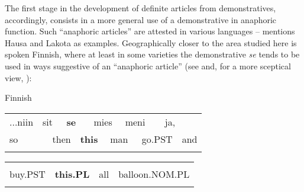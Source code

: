 \begin{styleBodyTextFirst}
The first stage in the development of definite articles from demonstratives, accordingly, consists in a more general use of a demonstrative in anaphoric function. Such “anaphoric articles” are attested in various languages – \citet[53-54]{Lyons1999} mentions Hausa and Lakota as examples. Geographically closer to the area studied here is spoken Finnish, where at least in some varieties the demonstrative \textit{se }tends to be used in ways suggestive of an “anaphoric article” (see \citet{Laury1997} and, for a more sceptical view, \citet{Juvonen2000}):

\end{styleBodyTextFirst}

\begin{listWWNumileveli}
\item {}

\begin{styleExample}
Finnish

\end{styleExample}

\end{listWWNumileveli}

\begin{tabular}{llllllllllll}
\lsptoprule
...niin & \multicolumn{2}{l}{sit

} & \multicolumn{2}{l}{{\bfseries se}

} & \multicolumn{2}{l}{mies

} & \multicolumn{2}{l}{meni

} & \multicolumn{2}{l}{ja,

} & \\
\multicolumn{2}{l}{so

} & \multicolumn{2}{l}{then

} & \multicolumn{2}{l}{{\bfseries this}

} & \multicolumn{2}{l}{man

} & \multicolumn{2}{l}{go.PST

} & \multicolumn{2}{l}{and

}\\
\lspbottomrule
\end{tabular}

\begin{tabular}{llll}
\lsptoprule
\multicolumn{4}{l}{osti

}\\
buy.PST & {\bfseries this.PL} & all & balloon.NOM.PL\\
\lspbottomrule
\end{tabular}

